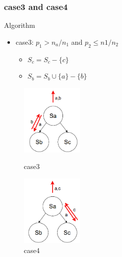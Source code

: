 \documentclass[notheorems, aspectratio=54]{beamer}
\begin{document}
\begin{frame}
    \frametitle{case3 and case4}
    \begin{block}{Algorithm}
        \begin{itemize}
            \item case3: $p_1 > n_a/n_1$  and  $p_2 \leq n1/n_2$
            \begin{itemize}
                \item $S_c = S_c - \{c\}$
                \item $S_b = S_b \cup \{a\} - \{b\}$
            \end{itemize}
        \end{itemize} 
    \end{block}
    \begin{figure}[htbp]
        \centering
        \begin{minipage}[t]{0.48\textwidth}
        \centering
        \includegraphics[width=3cm]{global_img_dir/Sampling3.png}
        \caption{case3}
        \end{minipage}
        \begin{minipage}[t]{0.48\textwidth}
        \centering
        \includegraphics[width=3cm]{global_img_dir/Sampling4.png}
        \caption{case4}
        \end{minipage}
    \end{figure}
\end{frame}
\end{document}
